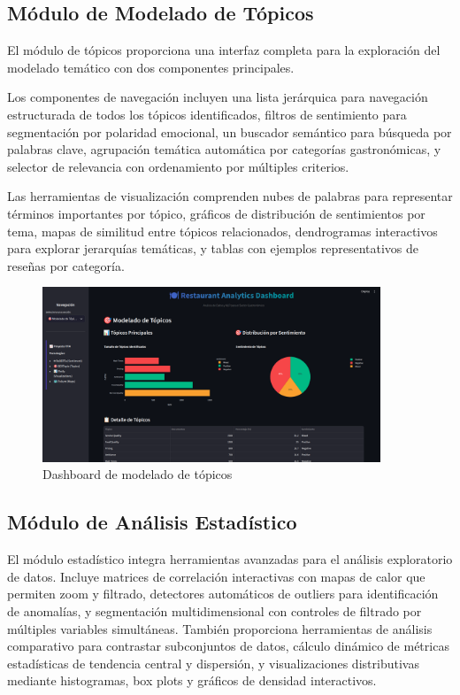 \documentclass[12pt,a4paper,twoside,openany]{book}
\begin{document}
\subsection{Módulo de Modelado de Tópicos}

El módulo de tópicos proporciona una interfaz completa para la exploración del modelado temático con dos componentes principales.

Los componentes de navegación incluyen una lista jerárquica para navegación estructurada de todos los tópicos identificados, filtros de sentimiento para segmentación por polaridad emocional, un buscador semántico para búsqueda por palabras clave, agrupación temática automática por categorías gastronómicas, y selector de relevancia con ordenamiento por múltiples criterios.

Las herramientas de visualización comprenden nubes de palabras para representar términos importantes por tópico, gráficos de distribución de sentimientos por tema, mapas de similitud entre tópicos relacionados, dendrogramas interactivos para explorar jerarquías temáticas, y tablas con ejemplos representativos de reseñas por categoría.

\begin{figure}[H]
\centering
\includegraphics[width=0.9\textwidth]{figures/streamlit_topic_modeling.png}
\caption{Dashboard de modelado de tópicos}
\label{fig:streamlit_topic_modeling}
\end{figure}

\subsection{Módulo de Análisis Estadístico}

El módulo estadístico integra herramientas avanzadas para el análisis exploratorio de datos. Incluye matrices de correlación interactivas con mapas de calor que permiten zoom y filtrado, detectores automáticos de outliers para identificación de anomalías, y segmentación multidimensional con controles de filtrado por múltiples variables simultáneas. También proporciona herramientas de análisis comparativo para contrastar subconjuntos de datos, cálculo dinámico de métricas estadísticas de tendencia central y dispersión, y visualizaciones distributivas mediante histogramas, box plots y gráficos de densidad interactivos.
\end{document}
